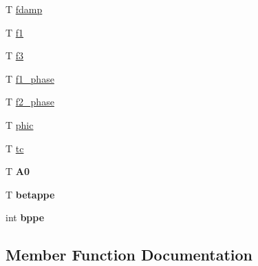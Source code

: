 \begin{DoxyCompactItemize}
T \hyperlink{structsource__parameters_adf9f63901b2a77eb0b89bba6ff68239e}{fdamp}
\item 
T \hyperlink{structsource__parameters_af053aa1c29b1fae75333ca7ac166e81c}{f1}
\item 
T \hyperlink{structsource__parameters_aea5ffd30832405cf32b6fa4d9fbd3ae6}{f3}
\item 
T \hyperlink{structsource__parameters_a41904030076ceee4599d6f22ff011daa}{f1\+\_\+phase}
\item 
T \hyperlink{structsource__parameters_a5ce4351ddc8a19f02c5475a7bcaa8e8d}{f2\+\_\+phase}
\item 
T \hyperlink{structsource__parameters_a60cbeb524afa4f18cc5c47b0b43c3c18}{phic}
\item 
T \hyperlink{structsource__parameters_ac0c03ead9615b4c9f27d160ad023db70}{tc}
\item 
\mbox{\label{structsource__parameters_a8153a3eb546d1da6d7de74a5b713edd8}} 
T {\bfseries A0}
\item 
\mbox{\label{structsource__parameters_a1e5a13aaedb6ddc91b3484599affe45a}} 
T {\bfseries betappe}
\item 
\mbox{\label{structsource__parameters_aae9043f974e68e299a941144382a6a39}} 
int {\bfseries bppe}
\end{DoxyCompactItemize}


\subsection{Member Function Documentation}
\mbox{\label{structsource__parameters_adb7351bdfa5b400df7feaaa1541e439c}} 
